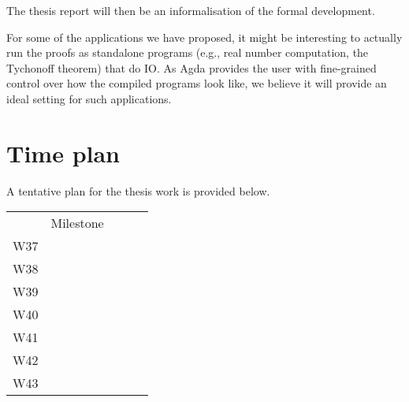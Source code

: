 \documentclass{article}
\begin{document}
The thesis report will then be an informalisation of the formal development.

For some of the applications we have proposed, it might be interesting to actually run the
proofs as standalone programs (e.g., real number computation, the Tychonoff theorem) that
do IO. As Agda provides the user with fine-grained control over how the compiled programs
look like, we believe it will provide an ideal setting for such applications.

\section{Time plan}

A tentative plan for the thesis work is provided below.

\begin{table}[]
\begin{tabular}{lllll}
     & Milestone        &  & \\
W37  &                  &  & \\
W38  &                  &  & \\
W39  &                  &  & \\
W40  &                  &  & \\
W41  &                  &  & \\
W42  &                  &  & \\
W43  &                  &  & \\
\end{tabular}
\end{table}



\end{document}
